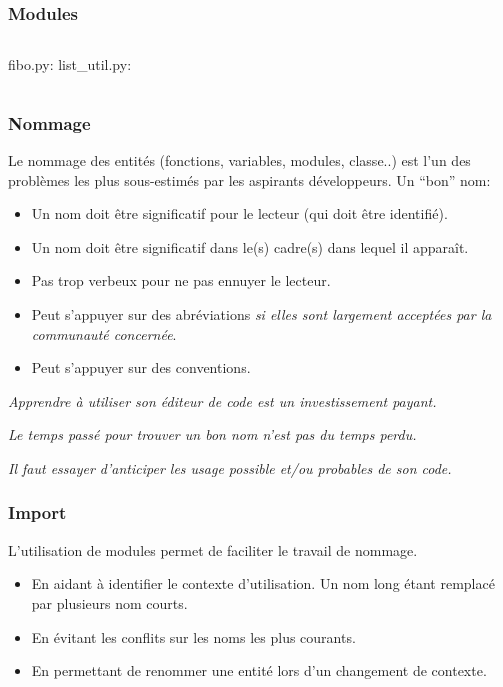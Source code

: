\documentclass{beamer}
\begin{document}
\begin{frame}[fragile]\frametitle{Modules}
  \begin{columns}
    fibo.py:
    \newline
    \fbox{}
    list\_util.py:
    \newline
    \fbox{}
  \end{columns}
  \fbox{}
\end{frame}

\begin{frame}[fragile]\frametitle{Nommage}
  
  Le nommage des entités (fonctions, variables, modules, classe..) est l'un des problèmes les plus sous-estimés par les aspirants développeurs.\linebreak
  Un ``bon'' nom:
  \begin{itemize}
  \item Un nom doit être significatif pour le lecteur (qui doit être identifié).
  \item Un nom doit être significatif dans le(s) cadre(s) dans lequel il apparaît.
  \item Pas trop verbeux pour ne pas ennuyer le lecteur.
  \item Peut s'appuyer sur des abréviations {\em si elles sont largement acceptées par la communauté concernée}.
  \item Peut s'appuyer sur des conventions.
  \end{itemize}

  {\em Apprendre à utiliser son éditeur de code est un investissement payant.}

  {\em Le temps passé pour trouver un bon nom n'est pas du temps perdu.}

  {\em Il faut essayer d'anticiper les usage possible et/ou probables de son code.}
  
\end{frame}

\begin{frame}[fragile]\frametitle{Import}
  
  L'utilisation de modules permet de faciliter le travail de nommage.
  \begin{itemize}
  \item En aidant à identifier le contexte d'utilisation. Un nom long étant remplacé par plusieurs nom courts.
  \item En évitant les conflits sur les noms les plus courants.
  \item En permettant de renommer une entité lors d'un changement de contexte.
  \end{itemize}
  \fbox{}
  \fbox{}
\end{frame}
\end{document}
